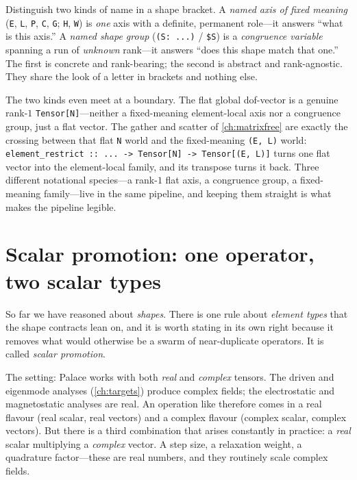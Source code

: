 \begin{keyidea}
Distinguish two kinds of name in a shape bracket. A \emph{named axis of fixed
meaning} (\texttt{E}, \texttt{L}, \texttt{P}, \texttt{C}, \texttt{G};
\texttt{H}, \texttt{W}) is \emph{one} axis with a definite, permanent role---it
answers ``what is this axis.'' A \emph{named shape group}
(\texttt{(S: ...)} / \texttt{\$S}) is a \emph{congruence variable} spanning a
run of \emph{unknown} rank---it answers ``does this shape match that one.''
The first is concrete and rank-bearing; the second is abstract and
rank-agnostic. They share the look of a letter in brackets and nothing else.
\end{keyidea}

The two kinds even meet at a boundary. The flat global dof-vector is a genuine
rank-$1$ \lstinline[style=l4style]|Tensor[N]|---neither a fixed-meaning
element-local axis nor a congruence group, just a flat vector. The gather and
scatter of \cref{ch:matrixfree} are exactly the crossing between that flat
\texttt{N} world and the fixed-meaning \lstinline[style=l4style]|(E, L)| world:
\lstinline[style=l4style]|element_restrict :: ... -> Tensor[N] -> Tensor[(E, L)]|
turns one flat vector into the element-local family, and its transpose turns it
back. Three different notational species---a rank-$1$ flat axis, a congruence
group, a fixed-meaning family---live in the same pipeline, and keeping them
straight is what makes the pipeline legible.

\section{Scalar promotion: one operator, two scalar types}
\label{sec:sh-promotion}

So far we have reasoned about \emph{shapes}. There is one rule about
\emph{element types} that the shape contracts lean on, and it is worth stating
in its own right because it removes what would otherwise be a swarm of
near-duplicate operators. It is called \emph{scalar promotion}.

The setting: Palace works with both \emph{real} and \emph{complex} tensors.
The driven and eigenmode analyses (\cref{ch:targets}) produce complex fields;
the electrostatic and magnetostatic analyses are real. An operation like
 therefore comes in a real flavour (real scalar, real vectors) and
a complex flavour (complex scalar, complex vectors). But there is a third
combination that arises constantly in practice: a \emph{real} scalar
multiplying a \emph{complex} vector. A step size, a relaxation weight, a
quadrature factor---these are real numbers, and they routinely scale complex
fields.

